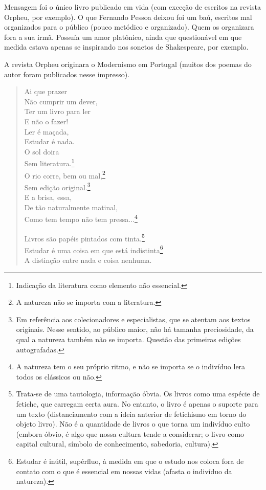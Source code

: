 Mensagem foi o único livro publicado em vida (com exceção de escritos na revista Orpheu, por exemplo). O que Fernando Pessoa deixou foi um baú, escritos mal organizados para o público (pouco metódico e organizado). Quem os organizara fora a sua irmã. Possuía um amor platônico, ainda que questionável em que medida estava apenas se inspirando nos sonetos de Shakespeare, por exemplo.

A revista Orpheu originara o Modernismo em Portugal (muitos dos poemas do autor foram publicados nesse impresso).

\begin{verse}
Ai que prazer \\
Não cumprir um dever, \\
Ter um livro para ler \\
E não o fazer! \\
Ler é maçada, \\
Estudar é nada. \\
O sol doira \\
Sem literatura.\footnote{Indicação da literatura como elemento não essencial.} \\
O rio corre, bem ou mal,\footnote{A natureza não se importa com a literatura.} \\
Sem edição original.\footnote{Em referência aos colecionadores e especialistas, que se atentam aos textos originais. Nesse sentido, ao público maior, não há tamanha preciosidade, da qual a natureza também não se importa. Questão das primeiras edições autografadas.} \\
E a brisa, essa, \\
De tão naturalmente matinal, \\
Como tem tempo não tem pressa...\footnote{A natureza tem o seu próprio ritmo, e não se importa se o indivíduo lera todos os clássicos ou não.}

Livros são papéis pintados com tinta.\footnote{Trata-se de uma tautologia, informação óbvia. Os livros como uma espécie de fetiche, que carregam certa aura. No entanto, o livro é apenas o suporte para um texto (distanciamento com a ideia anterior de fetichismo em torno do objeto livro). Não é a quantidade de livros o que torna um indivíduo culto (embora óbvio, é algo que nossa cultura tende a considerar; o livro como capital cultural, símbolo de conhecimento, sabedoria, cultura).} \\
Estudar é uma coisa em que está indistinta\footnote{Estudar é inútil, supérfluo, à medida em que o estudo nos coloca fora de contato com o que é essencial em nossas vidas (afasta o indivíduo da natureza).} \\
A distinção entre nada e coisa nenhuma.


\end{verse}
